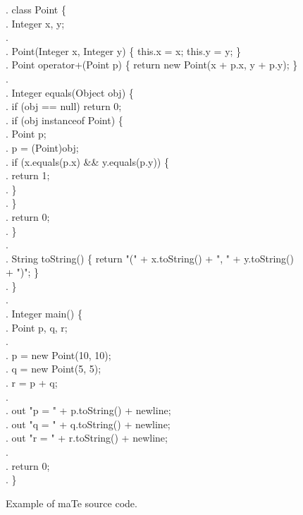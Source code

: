 \begin{figure}
\begin{small}
  \small \bnncode
  \codeln. class Point \{ \\
  \codeln. \> Integer x, y; \\
  \codeln. \\
  \codeln. \> Point(Integer x, Integer y) \{ this.x = x; this.y = y; \} \\
  \codeln. \> Point operator+(Point p) \{ return new Point(x + p.x, y + p.y); \} \\
  \codeln. \\
  \codeln. \> Integer equals(Object obj) \{ \\
  \codeln. \>\> if (obj == null) return 0; \\
  \codeln. \>\> if (obj instanceof Point) \{ \\
  \codeln. \>\>\> Point p; \\
  \codeln. \>\>\> p = (Point)obj; \\
  \codeln. \>\>\> if (x.equals(p.x) \&\& y.equals(p.y)) \{ \\
  \codeln. \>\>\>\> return 1; \\
  \codeln. \>\>\> \} \\
  \codeln. \>\> \} \\
  \codeln. \>\> return 0; \\
  \codeln. \> \} \\
  \codeln. \\
  \codeln. \> String toString() \{ return "(" + x.toString() + ", " + y.toString() + ")"; \} \\
  \codeln.  \} \\
  \codeln. \\
  \codeln. Integer main() \{ \\
  \codeln. \> Point p, q, r; \\
  \codeln. \\
  \codeln. \> p = new Point(10, 10); \\
  \codeln. \> q = new Point(5, 5); \\
  \codeln. \> r = p + q; \\
  \codeln. \\
  \codeln. \> out "p = " + p.toString() + newline; \\
  \codeln. \> out "q = " + q.toString() + newline; \\
  \codeln. \> out "r = " + r.toString() + newline; \\
  \codeln. \\
  \codeln. \> return 0; \\
  \codeln. \}
  \ecode \vspace{-0mm}
  \caption{\label{fig:mate-code} Example of maTe source code.}
\end{small}
\end{figure}

